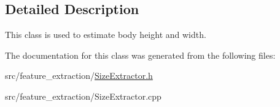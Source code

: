 \subsection{Detailed Description}
This class is used to estimate body height and width. 

The documentation for this class was generated from the following files\+:\begin{DoxyCompactItemize}
\item 
src/feature\+\_\+extraction/\mbox{\hyperlink{_size_extractor_8h}{Size\+Extractor.\+h}}\item 
src/feature\+\_\+extraction/Size\+Extractor.\+cpp\end{DoxyCompactItemize}
